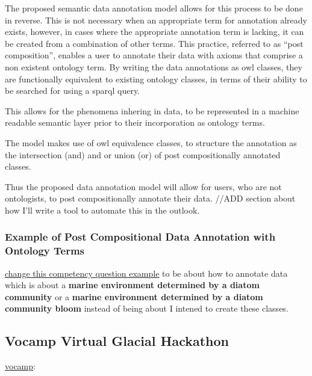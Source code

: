 \documentclass[]{article}
\begin{document}
The proposed semantic data annotation model allows for this process to
be done in reverse. This is not necessary when an appropriate term for
annotation already exists, however, in cases where the appropriate
annotation term is lacking, it can be created from a combination of
other terms. This practice, referred to as ``post composition'', enables
a user to annotate their data with axioms that comprise a non existent
ontology term. By writing the data annotations as owl classes, they are
functionally equivalent to existing ontology classes, in terms of their
ability to be searched for using a sparql query.

This allows for the phenomena inhering in data, to be represented in a
machine readable semantic layer prior to their incorporation as ontology
terms.

The model makes use of owl equivalence classes, to structure the
annotation as the intersection (and) and or union (or) of post
compositionally annotated classes.

Thus the proposed data annotation model will allow for users, who are
not ontologists, to post compositionally annotate their data. //ADD
section about how I'll write a tool to automate this in the outlook.

\hypertarget{example-of-post-compositional-data-annotation-with-ontology-terms}{%
\subsubsection{Example of Post Compositional Data Annotation with
Ontology
Terms}\label{example-of-post-compositional-data-annotation-with-ontology-terms}}

\href{https://github.com/kaiiam/kblumberg_masters_thesis/wiki/thesis-pieces\#pre-and-post-composition-of-complex-classes}{change
this competency question example} to be about how to annotate data which
is about a \textbf{marine environment determined by a diatom community}
or a \textbf{marine environment determined by a diatom community bloom}
instead of being about I intened to create these classes.

\hypertarget{vocamp-virtual-glacial-hackathon}{%
\subsection{Vocamp Virtual Glacial
Hackathon}\label{vocamp-virtual-glacial-hackathon}}

\href{http://vocamp.org/wiki/Main_Page}{vocamp}:
\end{document}

